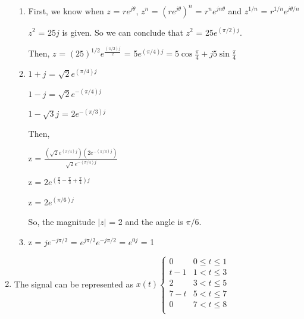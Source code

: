 \documentclass[10pt,a4paper, margin=1in]{article}
\begin{document}
\begin{enumerate}
\begin{enumerate}
    
    \item %
    
    First, we know when $z$ = $re^{j\theta}$, $z^n$ = $(r e^{j\theta})^n$ = $r^n e^{jn\theta}$ and  $z^{1/n}$ = $r^{1/n} e^{j\theta/n}$
    
    $z^2$ = 25$j$ is given. So we can conclude that $z^2$ = 25$e^{(\pi/2)j}$.
    \vspace{0.25cm}
    
    Then, $z$ = $(25)^{1/2}e^{\frac{(\pi/2)j}{2}}$ = 5$e^{(\pi/4)j} = 5\cos{\frac{\pi}{4}}+j5\sin{\frac{\pi}{4}}$
    \vspace{0.25cm}
    
    \item %
    
    $1+j$ = $\sqrt{2}e^{(\pi/4)j}$
    
    $1-j$ = $\sqrt{2}e^{-(\pi/4)j}$
    
    $1-\sqrt{3}j$ = $2e^{-(\pi/3)j}$
    
    Then,
    \vspace{0.25cm}
    
    z = $\frac{(\sqrt{2}e^{(\pi/4)j})(2e^{-(\pi/3)j})}{\sqrt{2}e^{-(\pi/4)j}}$
    
    z = 2$e^{(\frac{\pi}{4}-\frac{\pi}{3}+\frac{\pi}{4})j}$
    
    z = 2$e^{(\pi/6)j}$ 
    \vspace{0.25cm}
    
    So, the magnitude ${\vert z \vert}$ = 2 and the angle is $\pi/6$.
    \vspace{0.25cm}
    
    \item %
    
    z = $je^{-j\pi/2}$ = $e^{j\pi/2} e^{-j\pi/2}$ = $e^{0j}$ = 1
    
    \end{enumerate}


\item %
The signal can be represented as
$
x(t)
\begin{cases} 
      0 & 0 \leq t \leq 1 \\
      t-1 & 1 < t \leq 3 \\
      2 & 3 < t \leq 5 \\
      7-t & 5 < t \leq 7 \\
      0 & 7 < t \leq 8 \\
   \end{cases}
$
\vspace{0.25cm}


\end{enumerate}
\end{document}

